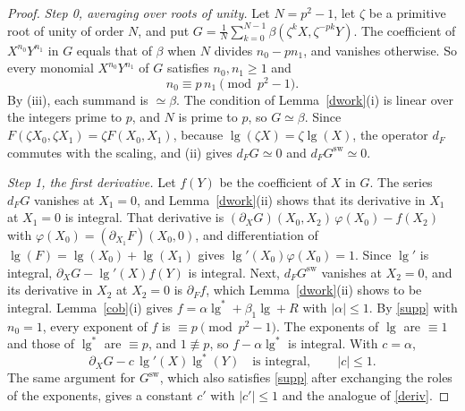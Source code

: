 \begin{proof}
\emph{Step 0, averaging over roots of unity.} Let $N=p^2-1$, let $\zeta$ be a primitive root of unity of order $N$, and put $G=\frac1N\sum_{k=0}^{N-1}\beta(\zeta^kX,\zeta^{-pk}Y)$. The coefficient of $X^{n_0}Y^{n_1}$ in $G$ equals that of $\beta$ when $N$ divides $n_0-pn_1$, and vanishes otherwise. So every monomial $X^{n_0}Y^{n_1}$ of $G$ satisfies $n_0,n_1\ge1$ and
\begin{equation}\label{supp}
n_0\equiv p\,n_1\pmod{p^2-1}.
\end{equation}
By (iii), each summand is $\simeq\beta$. The condition of Lemma~\ref{dwork}(i) is linear over the integers prime to $p$, and $N$ is prime to $p$, so $G\simeq\beta$. Since $F(\zeta X_0,\zeta X_1)=\zeta F(X_0,X_1)$, because $\operatorname{lg}(\zeta X)=\zeta\operatorname{lg}(X)$, the operator $d_F$ commutes with the scaling, and (ii) gives $d_FG\simeq0$ and $d_FG^{\mathrm{sw}}\simeq0$.

\emph{Step 1, the first derivative.} Let $f(Y)$ be the coefficient of $X$ in $G$. The series $d_FG$ vanishes at $X_1=0$, and Lemma~\ref{dwork}(ii) shows that its derivative in $X_1$ at $X_1=0$ is integral. That derivative is $(\partial_XG)(X_0,X_2)\,\varphi(X_0)-f(X_2)$ with $\varphi(X_0)=(\partial_{X_1}F)(X_0,0)$, and differentiation of $\operatorname{lg}(F)=\operatorname{lg}(X_0)+\operatorname{lg}(X_1)$ gives $\operatorname{lg}'(X_0)\varphi(X_0)=1$. Since $\operatorname{lg}'$ is integral, $\partial_XG-\operatorname{lg}'(X)f(Y)$ is integral. Next, $d_FG^{\mathrm{sw}}$ vanishes at $X_2=0$, and its derivative in $X_2$ at $X_2=0$ is $\partial_Ff$, which Lemma~\ref{dwork}(ii) shows to be integral. Lemma~\ref{cob}(i) gives $f=\alpha\operatorname{lg}^\ast+\beta_1\operatorname{lg}+R$ with $\lvert\alpha\rvert\le1$. By \eqref{supp} with $n_0=1$, every exponent of $f$ is $\equiv p\pmod{p^2-1}$. The exponents of $\operatorname{lg}$ are $\equiv1$ and those of $\operatorname{lg}^\ast$ are $\equiv p$, and $1\not\equiv p$, so $f-\alpha\operatorname{lg}^\ast$ is integral. With $c=\alpha$,
\begin{equation}\label{deriv}
\partial_XG-c\,\operatorname{lg}'(X)\operatorname{lg}^\ast(Y)\quad\text{is integral},\qquad\lvert c\rvert\le1 .
\end{equation}
The same argument for $G^{\mathrm{sw}}$, which also satisfies \eqref{supp} after exchanging the roles of the exponents, gives a constant $c'$ with $\lvert c'\rvert\le1$ and the analogue of \eqref{deriv}.


\end{proof}
